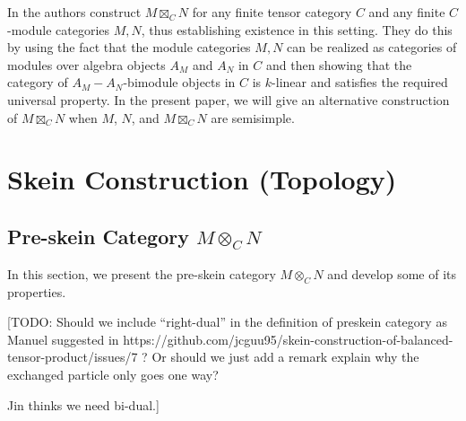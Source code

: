In \cite{douglas/balanced-product} the authors construct $M\boxtimes_C N$ for any finite tensor category $C$ and any finite $C$-module categories $M, N$, thus establishing existence in this setting. They do this by using the fact that the module categories $M,N$ can be realized as categories of modules over algebra objects $A_M$ and $A_N$ in $C$ and then showing that the category of $A_M-A_N$-bimodule objects in $C$ is $k$-linear and satisfies the required universal property. In the present paper, we will give an alternative construction of $M\boxtimes_C N$ when $M$, $N$, and $M \boxtimes_{C} N$ are semisimple.

\section{Skein Construction (Topology)}\label{section/skein-construction}

\subsection{Pre-skein Category $M\otimes_C N$}

\noindent In this section, we present the pre-skein category $M \otimes_{C} N$
and develop some of its properties.

[TODO: Should we include ``right-dual'' in the definition of preskein category
as Manuel suggested in
https://github.com/jcguu95/skein-construction-of-balanced-tensor-product/issues/7
? Or should we just add a remark explain why the exchanged particle only goes
one way?

Jin thinks we need bi-dual.]

